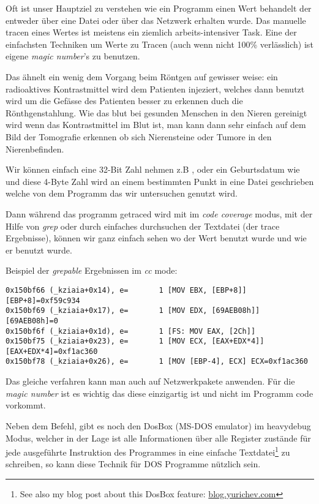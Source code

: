 
Oft ist unser Hauptziel zu verstehen wie ein Programm einen Wert behandelt der entweder \"uber eine Datei oder \"uber das Netzwerk erhalten wurde.
Das manuelle tracen eines Wertes ist meistens ein ziemlich arbeits-intensiver Task. Eine der einfachsten Techniken um Werte zu Tracen (auch wenn nicht 100\% verl\"asslich)
ist eigene \emph{magic number}'s zu benutzen. 

Das \"ahnelt ein wenig dem Vorgang beim R\"ontgen auf gewisser weise: ein radioaktives Kontrastmittel wird dem Patienten injeziert,
welches dann benutzt wird um die Gef\"asse des Patienten besser zu erkennen duch die R\"onthgenstahlung. Wie das blut bei 
gesunden Menschen in den Nieren gereinigt wird wenn das Kontrastmittel im Blut ist, man kann dann sehr einfach auf dem
Bild der Tomografie erkennen ob sich Nierensteine oder Tumore in den Nierenbefinden. 

Wir k\"onnen einfach eine 32-Bit Zahl nehmen z.B , oder ein Geburtsdatum wie 
und diese 4-Byte Zahl wird an einem bestimmten Punkt in eine Datei geschrieben welche von dem Programm 
das wir untersuchen genutzt wird. 

\myindex{\GrepUsage}

Dann w\"ahrend das programm getraced wird mit \tracer im \emph{code coverage} modus, mit der Hilfe von \emph{grep}
oder durch einfaches durchsuchen der Textdatei (der trace Ergebnisse), k\"onnen wir ganz einfach sehen wo der 
Wert benutzt wurde und wie er benutzt wurde. 

Beispiel der \emph{grepable} \tracer Ergebnissen im \emph{cc} mode:

\begin{lstlisting}[style=customasmx86]
0x150bf66 (_kziaia+0x14), e=       1 [MOV EBX, [EBP+8]] [EBP+8]=0xf59c934 
0x150bf69 (_kziaia+0x17), e=       1 [MOV EDX, [69AEB08h]] [69AEB08h]=0 
0x150bf6f (_kziaia+0x1d), e=       1 [FS: MOV EAX, [2Ch]] 
0x150bf75 (_kziaia+0x23), e=       1 [MOV ECX, [EAX+EDX*4]] [EAX+EDX*4]=0xf1ac360 
0x150bf78 (_kziaia+0x26), e=       1 [MOV [EBP-4], ECX] ECX=0xf1ac360 
\end{lstlisting}

Das gleiche verfahren kann man auch auf Netzwerkpakete anwenden.
F\"ur die \emph{magic number} ist es wichtig das diese einzigartig ist und nicht im Programm code vorkommt.

\newcommand{\DOSBOXURL}{\href{http://blog.yurichev.com/node/55}{blog.yurichev.com}}

Neben dem \tracer Befehl, gibt es noch den DosBox (MS-DOS emulator) im heavydebug Modus,
welcher in der Lage ist alle Informationen \"uber alle Register zust\"ande f\"ur jede ausgef\"uhrte Instruktion des Programmes in
eine einfache Textdatei\footnote{See also my blog post about this DosBox feature: \DOSBOXURL{}} zu schreiben, so kann
diese Technik f\"ur DOS Programme n\"utzlich sein. 

